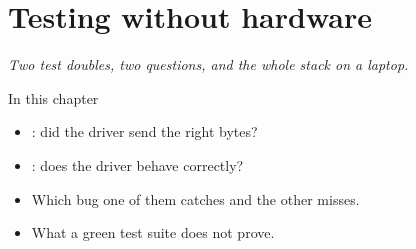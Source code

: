 \chapter{Testing without hardware}
\label{ch:testning}


{\large\itshape Two test doubles, two questions, and the whole stack on a laptop.\par}

\begin{chapterbox}{In this chapter}
\begin{itemize}
  \item {}: did the driver send the right bytes?
  \item {}: does the driver behave correctly?
  \item Which bug one of them catches and the other misses.
  \item What a green test suite does not prove.
\end{itemize}
\end{chapterbox}




